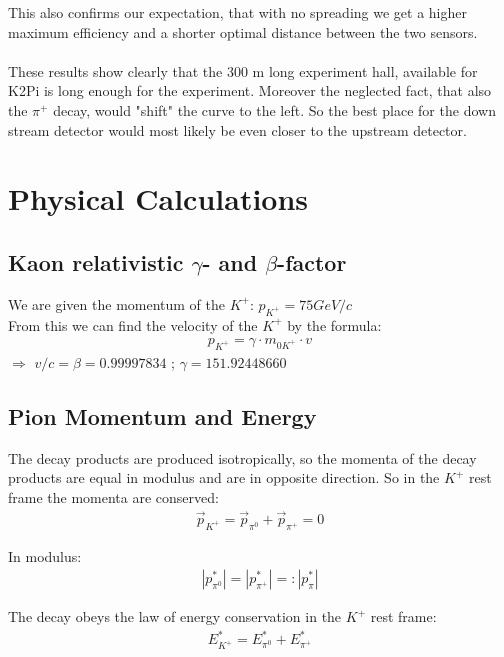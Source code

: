 \documentclass[a4paper,parskip,11pt, DIV12]{scrreprt}
\begin{document}
	This also confirms our expectation, that with no spreading we get a higher maximum efficiency and a shorter optimal distance between the two sensors.
	\\
	\\
	These results show clearly that the 300 m long experiment hall, available for K2Pi is long enough for the experiment. Moreover the neglected fact, that also the $\pi^+$ decay, would "shift" the curve to the left. So the best place for the down stream detector would most likely be even closer to the upstream detector. 
	\clearpage
	
	\chapter{Physical Calculations}
	
	\section{Kaon relativistic $\gamma$- and $\beta$-factor} \label{sec:gammabeta}
	
	We are given the momentum of the $K^+$: $p_{K^+} = 75 GeV/c$\\
	From this we can find the velocity of the $K^+$ by the formula:
	\begin{align*}
		p_{K^+} = \gamma \cdot m_{0K^+} \cdot v
	\end{align*}
	$\Rightarrow$
	$v/c = \beta = 0.99997834$ ;
	$\gamma = 151.92448660$\\
	
	\section{Pion Momentum and Energy} \label{sec:pE}
	
	The decay products are produced isotropically, so the momenta of the decay products are equal in modulus and are in opposite direction. 
	So in the $K^+$ rest frame the momenta are conserved:
	\begin{align*}
		\overrightarrow{p}_{K^+} = \overrightarrow{p}_{\pi^0} + \overrightarrow{p}_{\pi^+} = 0
	\end{align*}
	
	In modulus:
	\begin{align*}
		|p^*_{\pi^0}| = |p^*_{\pi^+}| =: |p^*_{\pi}|
	\end{align*}
	
	The decay obeys the law of energy conservation in the $K^+$ rest frame:
	\begin{align*}
		E^*_{K^+} = E^*_{\pi^0} + E^*_{\pi^+}
	\end{align*}
	
\end{document}
